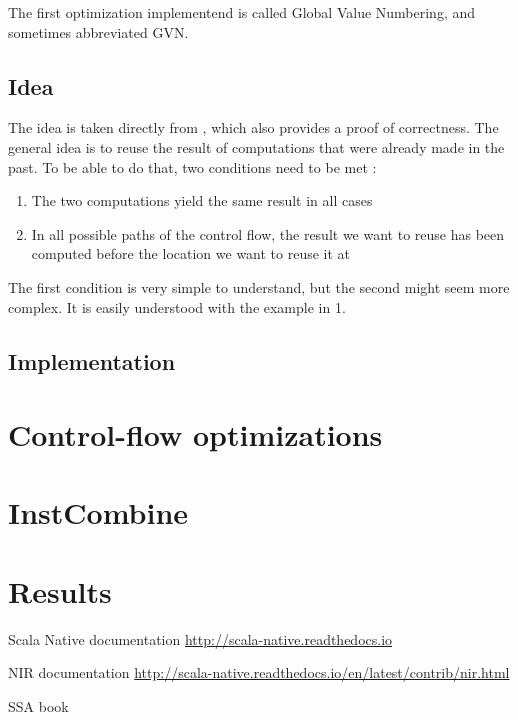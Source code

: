 \documentclass[11pt,a4paper]{article}
\begin{document}
The first optimization implementend is called Global Value Numbering, and sometimes abbreviated GVN.

\subsection{Idea}

The idea is taken directly from \cite{ssabook}, which also provides a proof of correctness. The general idea is to reuse the result of computations that were already made in the past. To be able to do that, two conditions need to be met :

\begin{enumerate}
\item The two computations yield the same result in all cases
\item In all possible paths of the control flow, the result we want to reuse has been computed before the location we want to reuse it at
\end{enumerate}

The first condition is very simple to understand, but the second might seem more complex. It is easily understood with the example in 1.



\subsection{Implementation}

\section{Control-flow optimizations}


\section{InstCombine}


\section{Results}


\begin{thebibliography}{9}

    Scala Native documentation \newline \url{http://scala-native.readthedocs.io}

	 NIR documentation \newline \url{http://scala-native.readthedocs.io/en/latest/contrib/nir.html}
	
	 SSA book

\end{thebibliography}
\end{document}
